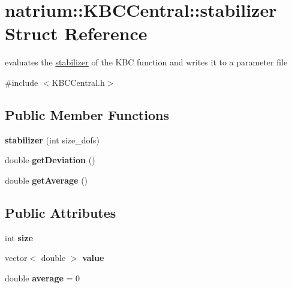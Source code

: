 \hypertarget{structnatrium_1_1KBCCentral_1_1stabilizer}{
\section{natrium::KBCCentral::stabilizer Struct Reference}
\label{structnatrium_1_1KBCCentral_1_1stabilizer}
}


evaluates the \hyperlink{structnatrium_1_1KBCCentral_1_1stabilizer}{stabilizer} of the KBC function and writes it to a parameter file  


{\ttfamily \#include $<$KBCCentral.h$>$}\subsection*{Public Member Functions}
\begin{DoxyCompactItemize}
\item 
\hypertarget{structnatrium_1_1KBCCentral_1_1stabilizer_ac157acbd6128e424ff8b1512dfeffe5d}{
{\bfseries stabilizer} (int size\_\-dofs)}
\label{structnatrium_1_1KBCCentral_1_1stabilizer_ac157acbd6128e424ff8b1512dfeffe5d}

\item 
\hypertarget{structnatrium_1_1KBCCentral_1_1stabilizer_a499f1517132f7881d6922c9dae8a19b0}{
double {\bfseries getDeviation} ()}
\label{structnatrium_1_1KBCCentral_1_1stabilizer_a499f1517132f7881d6922c9dae8a19b0}

\item 
\hypertarget{structnatrium_1_1KBCCentral_1_1stabilizer_ad919d4a5f8addbb1423ddcbf1b2aa2dc}{
double {\bfseries getAverage} ()}
\label{structnatrium_1_1KBCCentral_1_1stabilizer_ad919d4a5f8addbb1423ddcbf1b2aa2dc}

\end{DoxyCompactItemize}
\subsection*{Public Attributes}
\begin{DoxyCompactItemize}
\item 
\hypertarget{structnatrium_1_1KBCCentral_1_1stabilizer_aebd566314a68f74f1c513097aee65514}{
int {\bfseries size}}
\label{structnatrium_1_1KBCCentral_1_1stabilizer_aebd566314a68f74f1c513097aee65514}

\item 
\hypertarget{structnatrium_1_1KBCCentral_1_1stabilizer_aa7d348c93b632e0235949d480c3fd2f2}{
vector$<$ double $>$ {\bfseries value}}
\label{structnatrium_1_1KBCCentral_1_1stabilizer_aa7d348c93b632e0235949d480c3fd2f2}

\item 
\hypertarget{structnatrium_1_1KBCCentral_1_1stabilizer_aa879c7f067a0dfb7b5b90c879bd423a6}{
double {\bfseries average} = 0}
\label{structnatrium_1_1KBCCentral_1_1stabilizer_aa879c7f067a0dfb7b5b90c879bd423a6}

\end{DoxyCompactItemize}


